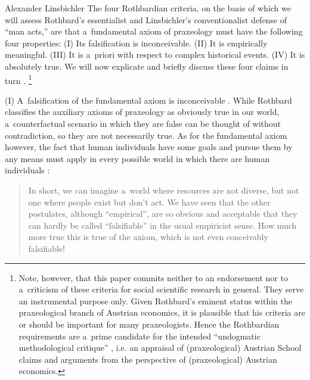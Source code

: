 \begin{artengenv}{Alexander Linsbichler}
The four Rothbardian criteria, on the basis of which we will assess Rothbard's essentialist and Linsbichler's conventionalist defense of ``man acts,'' are that a~fundamental axiom of praxeology must have the following four properties: (I) Its falsification is inconceivable. (II) It is empirically meaningful. (III) It is a~priori with respect to complex historical events. (IV) It is absolutely true. We will now explicate and briefly discuss these four claims in turn 
\parencites[][pp.314, 317–319]{rothbard_defense_1957}[][p.25]{rothbard_praxeology:_1976}.%
\footnote{Note, however, that this paper commits neither to an endorsement nor to a~criticism of these criteria for social scientific research in general. They serve an instrumental purpose only. Given Rothbard's eminent status within the praxeological branch of Austrian economics, it is plausible that his criteria are or should be important for many praxeologists. Hence the Rothbardian requirements are a~prime candidate for the intended ``undogmatic methodological critique'' 
\parencite[][p.129]{caldwell_praxeology_1984}, %
 i.e. an appraisal of (praxeological) Austrian School claims and arguments from the perspective of (praxeological) Austrian economics.}

\medskip

\noindent (I) A~falsification of the fundamental axiom is inconceivable 
\parencite[][p.318]{rothbard_defense_1957}. %
 While Rothbard classifies the auxiliary axioms of praxeology as obviously true in our world, a~counterfactual scenario in which they are false can be thought of without contradiction, so they are not necessarily true. As for the fundamental axiom however, the fact that human individuals have some goals and pursue them by any means must apply in every possible world in which there are human individuals 
\parencite[][pp.314–315]{rothbard_defense_1957}:%




\begin{quote}
In short, we can imagine a~world where resources are not diverse, but not one where people exist but don't act. We have seen that the other postulates, although ``empirical'', are so obvious and acceptable that they can hardly be called ``falsifiable'' in the usual empiricist sense. How much more true this is true of the axiom, which is not even conceivably falsifiable! 
\parencite[][p.317]{rothbard_defense_1957}%
\end{quote}





\end{artengenv}
